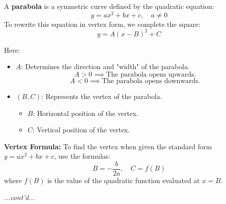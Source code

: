 \documentclass{article}
\begin{document}
\begin{definitionbox}
A \textbf{parabola} is a symmetric curve defined by the quadratic equation:  
\[
    y = ax^2 + bx + c, \quad a \neq 0
\]
To rewrite this equation in vertex form, we complete the square:  
\[
    y = A(x - B)^2 + C
\]

Here:  
\begin{itemize}
    \item \( A \): Determines the direction and "width" of the parabola.  
    \[
        A > 0 \implies \text{The parabola opens upwards.}
    \]  
    \[
        A < 0 \implies \text{The parabola opens downwards.}
    \]
    \item \( (B, C) \): Represents the vertex of the parabola.
    \begin{itemize} 
        \item[\labelitemi] \( B \): Horizontal position of the vertex.  
        \item[\labelitemi] \( C \): Vertical position of the vertex.
    \end{itemize} 
\end{itemize}

\begin{algorithmbox}

    \textbf{Vertex Formula:}  
    To find the vertex when given the standard form \( y = ax^2 + bx + c \), use the formulas:  
    \[
        B = -\frac{b}{2a}, \quad C = f(B)
    \]
    where \( f(B) \) is the value of the quadratic function evaluated at \( x = B \).
\end{algorithmbox}
\textit{...cont'd...}
\end{definitionbox}
\end{document}
